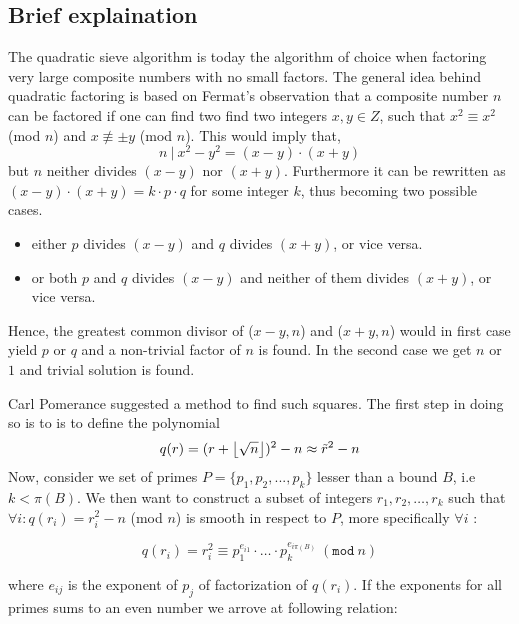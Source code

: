 \subsection{Brief explaination}
The quadratic sieve algorithm is today the algorithm of choice when factoring very large composite numbers
with no small factors. The general idea behind quadratic factoring is based on Fermat's observation that
a composite number $n$ can be factored if one can find two find two integers $x,y \in Z$, such
that $x^2 \equiv x^2$ (mod $n$) and $x \not\equiv \pm y$ (mod $n$). This would imply that,
\begin{equation}
n \ | \ x^2-y^2 = (x-y) \cdot (x+y)
\end{equation}
but $n$ neither divides $(x-y)$ nor $(x+y)$. 
Furthermore it can be rewritten as $(x-y) \cdot (x+y) = k \cdot p \cdot q$ for some integer $k$, thus becoming two possible cases.

\begin{itemize}
	\item either $p$ divides $(x-y)$ and $q$ divides $(x+y)$, or vice versa.
	\item or both $p$ and $q$ divides $(x-y)$ and neither of them divides $(x+y)$, or vice versa.
\end{itemize}

Hence, the greatest common divisor of ($x-y,n$) and ($x+y,n$) would in first case yield $p$ or $q$ and a non-trivial factor of 
$n$ is found. In the second case we get $n$ or $1$ and trivial solution is found. 

Carl Pomerance suggested a method to find such squares\cite{Pomerance1985}. The first step in doing so is to is to define the polynomial 
\begin{equation}
q(r) = (r + \left \lfloor \sqrt{n} \right \rfloor)^2-n \approx \tilde{r}^2-n
\end{equation}
Now, consider we set of primes $P = \{ p_1, p_2, ..., p_k \}$ lesser than a bound $B$, i.e $k < \pi(B)$. We then want to construct a subset of integers  $r_1, r_2, \ldots, r_k$ such that $\forall i : q(r_i) = r_i^2-n$ (mod $n$) is smooth in respect to $P$, more specifically $\forall i$ :

\begin{equation}
 q(r_i) = r_i^2 \equiv p_1^{e_{i1}} \cdot \ldots \cdot p_k^{e_{i\pi(B)}} \ (\texttt{mod} \ n)
\end{equation}

where $e_{ij}$ is the exponent of $p_j$ of factorization of $q(r_i)$. If the exponents for all primes sums to
an even number we arrove at following relation:

